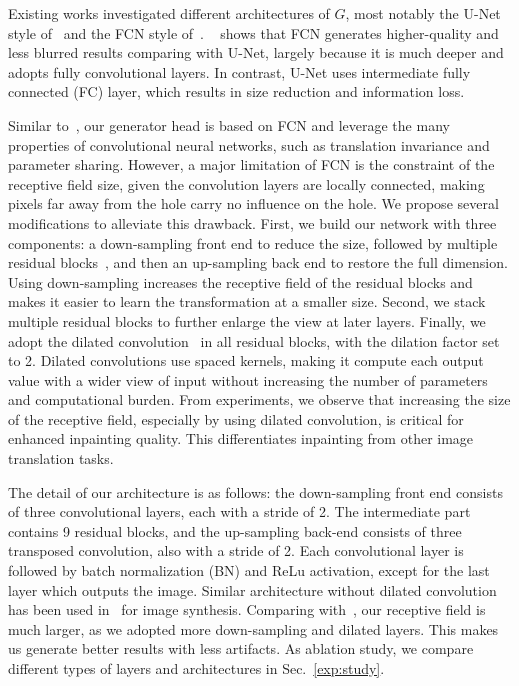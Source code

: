 Existing works investigated different architectures of $G$, most notably the U-Net style of~\cite{pathak2016context} and the FCN style of~\cite{iizuka2017globally}. ~\cite{iizuka2017globally} shows that FCN generates higher-quality and less blurred results comparing with U-Net, largely because it is much deeper and adopts fully convolutional layers. In contrast, U-Net uses intermediate fully connected (FC) layer, which results in size reduction and information loss. 

Similar to~\cite{iizuka2017globally}, our generator head is based on FCN and leverage the many properties of convolutional neural networks, such as translation invariance and parameter sharing. However, a major limitation of FCN is the constraint of the receptive field size, given the convolution layers are locally connected, making pixels far away from the hole carry no influence on the hole. We propose several modifications to alleviate this drawback. First, we build our network with three components: a down-sampling front end to reduce the size, followed by multiple residual blocks~\cite{he2016deep}, and then an up-sampling back end to restore the full dimension. Using down-sampling increases the receptive field of the residual blocks and makes it easier to learn the transformation at a smaller size. Second, we stack multiple residual blocks to further enlarge the view at later layers. Finally, we adopt the dilated convolution~\cite{yu2015multi} in all residual blocks, with the dilation factor set to 2. Dilated convolutions use spaced kernels, making it compute each output value with a wider view of input without increasing the number of parameters and computational burden. From experiments, we observe that increasing the size of the receptive field, especially by using dilated convolution, is critical for enhanced inpainting quality. This differentiates inpainting from other image translation tasks.

The detail of our architecture is as follows: the down-sampling front end consists of three convolutional layers, each with a stride of 2. The intermediate part contains 9 residual blocks, and the up-sampling back-end consists of three transposed convolution, also with a stride of 2. Each convolutional layer is followed by batch normalization (BN) and ReLu activation, except for the last layer which outputs the image. Similar architecture without dilated convolution has been used in~\cite{wang2017high} for image synthesis. Comparing with~\cite{iizuka2017globally}, our receptive field is much larger, as we adopted more down-sampling and dilated layers. This makes us generate better results with less artifacts. As ablation study, we compare different types of layers and architectures in Sec.~\ref{exp:study}.

